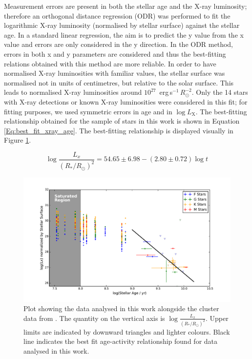 Measurement errors are present in both the stellar age and the X-ray luminosity; therefore an orthogonal distance regression (ODR) \citep{Boggs_Rogers_1990} was performed to fit the logarithmic X-ray luminosity (normalised by stellar surface) against the stellar age. In a standard linear regression, the aim is to predict the y value from the x value and errors are only considered in the y direction. In the ODR method, errors in both x and y parameters are considered and thus the best-fitting relations obtained with this method are more reliable. In order to have normalised X-ray luminosities with familiar values, the stellar surface was normalised not in units of centimetres, but relative to the solar surface. This leads to normalised X-ray luminosities around $10^{27}$~erg\,s$^{-1}$\,$R_\odot^{-2}$. Only the 14 stars with X-ray detections or known X-ray luminosities were considered in this fit; for fitting purposes, we used symmetric errors in age and in $\log L_{\mathrm{X}}$. The best-fitting relationship obtained for the sample of stars in this work is shown in Equation \ref{Eq:best_fit_xray_age}. The best-fitting relationship is displayed visually in Figure \ref{fig:full_xray_plot_with_clusters}.

\begin{equation}
	\log\frac{L_{x}}{(R_\ast/R_\odot)^{2}} = 54.65 \pm 6.98 - (2.80 \pm 0.72)\log t
	\label{Eq:best_fit_xray_age}
\end{equation}

\begin{figure}
    \centering
    \includegraphics[scale=0.55]{Figures/3-Xray_age/full_xray_results.pdf}
    \caption[Plot of X-ray sample with best-fitting relationship and cluster data for reference]{Plot showing the data analysed in this work alongside the cluster data from \citet{Jackson_etal_2012}. The quantity on the vertical axis is $\log\frac{L_{x}}{(R_\ast/R_\odot)^{2}}$. Upper limits are indicated by downward triangles and lighter colours.  Black line indicates the best fit age-activity relationship found for data analysed in this work.}
    \label{fig:full_xray_plot_with_clusters}
\end{figure}

